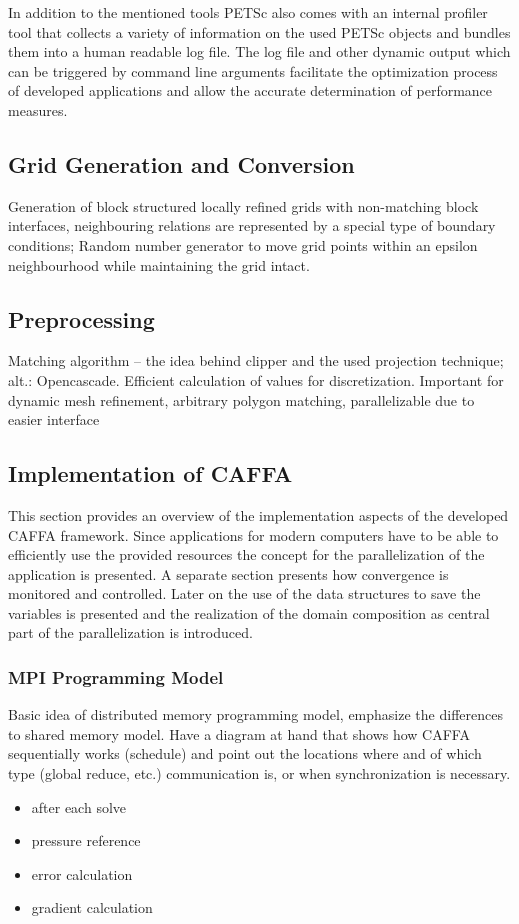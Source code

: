 In addition to the mentioned tools PETSc also comes with an internal profiler tool that collects a variety of information on the used PETSc objects and bundles them into a human readable log file. The log file and other dynamic output which can be triggered by command line arguments facilitate the optimization process of developed applications and allow the accurate determination of performance measures.

\subsection{Grid Generation and Conversion}

Generation of block structured locally refined grids with non-matching block interfaces, neighbouring relations are represented by a special type of boundary conditions; Random number generator to move grid points within an epsilon neighbourhood while maintaining the grid intact. 

\subsection{Preprocessing}
Matching algorithm -- the idea behind clipper and the used projection technique; alt.: Opencascade. Efficient calculation of values for discretization. Important for dynamic mesh refinement, arbitrary polygon matching, parallelizable due to easier interface

\subsection{Implementation of CAFFA}

This section provides an overview of the implementation aspects of the developed CAFFA framework. Since applications for modern computers have to be able to efficiently use the provided resources the concept for the parallelization of the application is presented. A separate section presents how convergence is monitored and controlled. Later on the use of the data structures to save the variables is presented and the realization of the domain composition as central part of the parallelization is introduced.

\subsubsection{MPI Programming Model}
Basic idea of distributed memory programming model, emphasize the differences to shared memory model. Have a diagram at hand that shows how CAFFA sequentially works (schedule) and point out the locations where and of which type (global reduce, etc.) communication is, or when synchronization is necessary.
\begin{itemize}
  \item after each solve
  \item pressure reference
  \item error calculation
  \item gradient calculation
\end{itemize}
        
